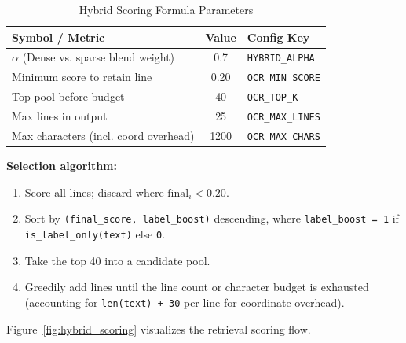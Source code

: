 \documentclass[11pt,a4paper]{article}
\begin{document}
\begin{table}[H]
\centering
\caption{Hybrid Scoring Formula Parameters}
\label{tab:hybrid_params}
\begin{tabular}{|p{6cm}|c|l|}
\hline
\textbf{Symbol / Metric} & \textbf{Value} & \textbf{Config Key} \\ \hline
$\alpha$ (Dense vs. sparse blend weight) & 0.7 & \texttt{HYBRID\_ALPHA} \\ \hline
Minimum score to retain line & 0.20 & \texttt{OCR\_MIN\_SCORE} \\ \hline
Top pool before budget & 40 & \texttt{OCR\_TOP\_K} \\ \hline
Max lines in output & 25 & \texttt{OCR\_MAX\_LINES} \\ \hline
Max characters (incl. coord overhead) & 1200 & \texttt{OCR\_MAX\_CHARS} \\ \hline
\end{tabular}
\end{table}

\noindent\textbf{Selection algorithm:}
\begin{enumerate}
    \item Score all lines; discard where $\text{final}_i < 0.20$.
    \item Sort by \texttt{(final\_score, label\_boost)} descending, where \texttt{label\_boost = 1} if \texttt{is\_label\_only(text)} else \texttt{0}.
    \item Take the top 40 into a candidate pool.
    \item Greedily add lines until the line count or character budget is exhausted (accounting for \texttt{len(text) + 30} per line for coordinate overhead).
\end{enumerate}

Figure~\ref{fig:hybrid_scoring} visualizes the retrieval scoring flow.
\end{document}
